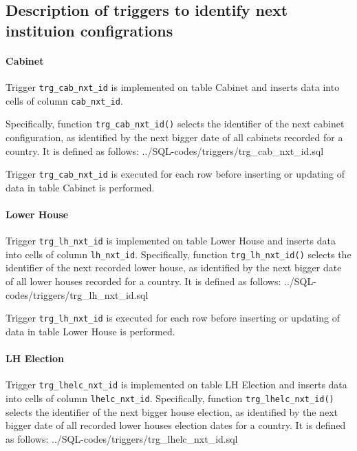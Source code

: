 \subsection{Description of triggers to identify next instituion configrations}\label{subsec_appx_trigger_nxt_ids}

\paragraph{Cabinet}\label{trg_cab_nxt_id}
Trigger \texttt{trg\_cab\_nxt\_id} is implemented on table Cabinet and inserts data into cells of column \texttt{cab\_nxt\_id}. 

Specifically, function \texttt{trg\_cab\_nxt\_id()} selects the identifier of the next cabinet configuration, as identified by the next bigger date of all cabinets recorded for a country.
It is defined as follows:
%
{../SQL-codes/triggers/trg_cab_nxt_id.sql}

Trigger \texttt{trg\_cab\_nxt\_id} is executed for each row before inserting or updating of data in table Cabinet is performed. 

\paragraph{Lower House}\label{trg_lh_nxt_id}
Trigger \texttt{trg\_lh\_nxt\_id} is implemented on table Lower House and inserts data into cells of column \texttt{lh\_nxt\_id}. 
Specifically, function \texttt{trg\_lh\_nxt\_id()} selects the identifier of the next recorded lower house, as identified by the next bigger date of all lower houses recorded for a country.
It is defined as follows:
%
{../SQL-codes/triggers/trg_lh_nxt_id.sql}

Trigger \texttt{trg\_lh\_nxt\_id} is executed for each row before inserting or updating of data in table Lower House is performed. 


\paragraph{LH Election}\label{trg_lhelc_nxt_id}
Trigger \texttt{trg\_lhelc\_nxt\_id} is implemented on table LH Election and inserts data into cells of column \texttt{lhelc\_nxt\_id}. 
Specifically, function \texttt{trg\_lhelc\_nxt\_id()} selects the identifier of the next bigger house election, as identified by the next bigger date of all recorded lower houses election dates for a country.
It is defined as follows:
%
{../SQL-codes/triggers/trg_lhelc_nxt_id.sql}

